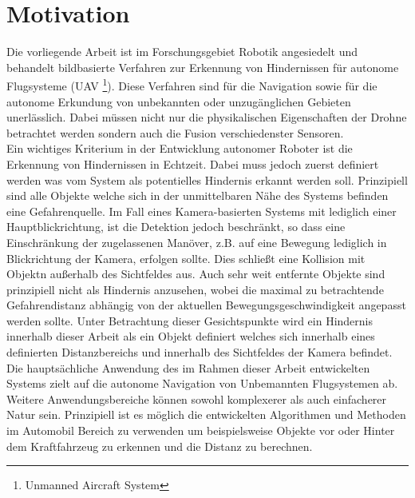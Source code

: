 \section{Motivation}
\label{sec:motivation}

Die vorliegende Arbeit ist im Forschungsgebiet Robotik angesiedelt und behandelt bildbasierte Verfahren zur Erkennung von Hindernissen für autonome Flugsysteme (UAV \footnote{Unmanned Aircraft System}). Diese Verfahren sind für die Navigation sowie für die autonome Erkundung von unbekannten oder unzugänglichen Gebieten unerlässlich. Dabei müssen nicht nur die physikalischen Eigenschaften der Drohne betrachtet werden sondern auch die Fusion verschiedenster Sensoren.\\

\noindent
Ein wichtiges Kriterium in der Entwicklung autonomer Roboter ist die Erkennung von Hindernissen in Echtzeit. Dabei muss jedoch zuerst definiert werden was vom System als potentielles Hindernis erkannt werden soll. Prinzipiell sind alle Objekte welche sich in der unmittelbaren Nähe des Systems befinden eine Gefahrenquelle. Im Fall eines Kamera-basierten Systems mit lediglich einer Hauptblickrichtung, ist die Detektion jedoch beschränkt, so dass eine Einschränkung der zugelassenen Manöver, z.B. auf eine Bewegung lediglich in Blickrichtung der Kamera, erfolgen sollte. Dies schließt eine Kollision mit Objektn außerhalb des Sichtfeldes aus. Auch sehr weit entfernte Objekte sind prinzipiell nicht als Hindernis anzusehen, wobei die maximal zu betrachtende Gefahrendistanz abhängig von der aktuellen Bewegungsgeschwindigkeit angepasst werden sollte. Unter Betrachtung dieser Gesichtspunkte wird ein Hindernis innerhalb dieser Arbeit als ein Objekt definiert welches sich innerhalb eines definierten Distanzbereichs und innerhalb des Sichtfeldes der Kamera befindet.\\

\noindent
Die hauptsächliche Anwendung des im Rahmen dieser Arbeit entwickelten Systems zielt auf die autonome Navigation von Unbemannten Flugsystemen ab. Weitere Anwendungsbereiche können sowohl komplexerer als auch einfacherer Natur sein. Prinzipiell ist es möglich die entwickelten Algorithmen und Methoden im Automobil Bereich zu verwenden um beispielsweise Objekte vor oder Hinter dem Kraftfahrzeug zu erkennen und die Distanz zu berechnen. 


